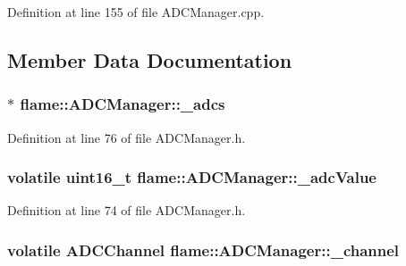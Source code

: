 Definition at line 155 of file A\-D\-C\-Manager.\-cpp.



\subsection{Member Data Documentation}
\hypertarget{classflame_1_1_a_d_c_manager_a04cc074d97fbb83004821333a786cc6b}{
\subsubsection[{\-\_\-adcs}]{$\ast$ flame\-::\-A\-D\-C\-Manager\-::\-\_\-adcs\hspace{0.3cm}{\ttfamily [protected]}}}\label{classflame_1_1_a_d_c_manager_a04cc074d97fbb83004821333a786cc6b}


Definition at line 76 of file A\-D\-C\-Manager.\-h.

\hypertarget{classflame_1_1_a_d_c_manager_a60ec78c37e926899fd23835347a4dcd5}{
\subsubsection[{\-\_\-adc\-Value}]{\setlength{\rightskip}{0pt plus 5cm}volatile uint16\-\_\-t flame\-::\-A\-D\-C\-Manager\-::\-\_\-adc\-Value\hspace{0.3cm}{\ttfamily [protected]}}}\label{classflame_1_1_a_d_c_manager_a60ec78c37e926899fd23835347a4dcd5}


Definition at line 74 of file A\-D\-C\-Manager.\-h.

\hypertarget{classflame_1_1_a_d_c_manager_a1591a81f54b5045fa73807f8ec941ef4}{
\subsubsection[{\-\_\-channel}]{\setlength{\rightskip}{0pt plus 5cm}volatile {\bf A\-D\-C\-Channel} flame\-::\-A\-D\-C\-Manager\-::\-\_\-channel\hspace{0.3cm}{\ttfamily [protected]}}}\label{classflame_1_1_a_d_c_manager_a1591a81f54b5045fa73807f8ec941ef4}



